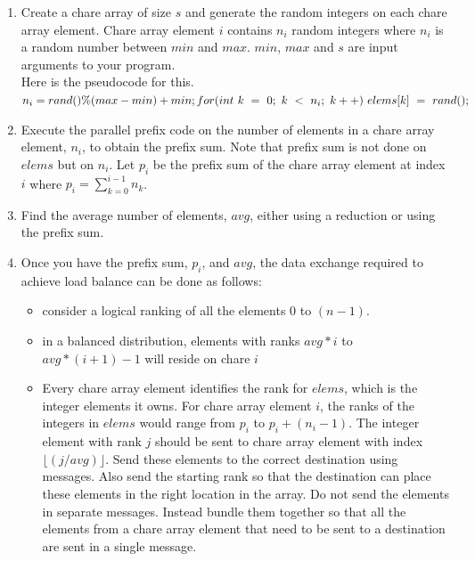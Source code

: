 \documentclass{article}
\begin{document}
\begin{enumerate}

\item Create a chare array of size $s$ and generate the random integers on
each chare array element. Chare array element $i$ contains $n_i$ random integers
where $n_i$ is a random number between $min$ and $max$. $min$,
$max$ and $s$ are input arguments to your program.\\Here is the pseudocode for
this.\\$ n_i = rand() \%
(max - min) + min;\\ for(int\ k\ =\ 0;\ k\ <\ n_i;\ k++)\ {elems[k]\ =\ rand();}$

\item Execute the parallel prefix code on the number of elements in a chare array
element, $n_i$, to obtain the prefix sum. Note that prefix sum is not done on
$elems$ but on $n_i$. Let $p_i$ be the prefix sum of the
chare array element at index $i$ where $p_i = \sum\limits_{k=0}^{i-1} n_k$.

\item Find the average number of elements, $avg$, either using a reduction or
using the prefix sum.

\item Once you have the prefix sum, $p_i$, and $avg$, the data exchange required to achieve load
balance can be done as follows:
\begin{itemize}
\item consider a logical ranking of all the elements $0$ to $(n-1)$.
\item in a balanced distribution, elements with ranks $avg*i$ to $avg*(i +1)-1$ will reside on chare $i$
\item Every chare array element identifies the rank for $elems$, which is the integer elements it
owns. For chare array element $i$, the ranks of the integers in $elems$ would
range from $p_i$ to $p_i + (n_i - 1)$. The integer element with rank $j$ should be
sent to chare array element with index $\lfloor(j/avg)\rfloor$. Send these elements to
the correct destination using messages. Also send the starting rank so that the
destination can place these elements in the right location in the array. Do not
send the elements in separate messages. Instead bundle them together so that
all the elements from a chare array element that need to be sent to a
destination are sent in a single message.
\end{itemize}


\end{enumerate}
\end{document}
